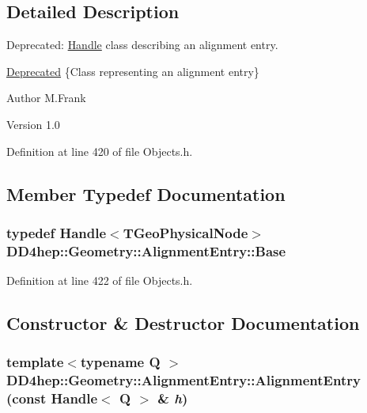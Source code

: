 \subsection{Detailed Description}
Deprecated: \hyperlink{class_d_d4hep_1_1_handle}{Handle} class describing an alignment entry. \begin{Desc}
\item[\hyperlink{deprecated__deprecated000001}{Deprecated}]\{Class representing an alignment entry\}\end{Desc}
\begin{DoxyAuthor}{Author}
M.Frank 
\end{DoxyAuthor}
\begin{DoxyVersion}{Version}
1.0 
\end{DoxyVersion}


Definition at line 420 of file Objects.h.

\subsection{Member Typedef Documentation}
\hypertarget{class_d_d4hep_1_1_geometry_1_1_alignment_entry_a5292caf0fb24d8750c2c24ef8f69a258}{
\subsubsection[{Base}]{\setlength{\rightskip}{0pt plus 5cm}typedef {\bf Handle}$<$TGeoPhysicalNode$>$ {\bf DD4hep::Geometry::AlignmentEntry::Base}}}
\label{class_d_d4hep_1_1_geometry_1_1_alignment_entry_a5292caf0fb24d8750c2c24ef8f69a258}


Definition at line 422 of file Objects.h.

\subsection{Constructor \& Destructor Documentation}
\hypertarget{class_d_d4hep_1_1_geometry_1_1_alignment_entry_adff0670c0104476e4a7fcb1d1d0ec36d}{
\subsubsection[{AlignmentEntry}]{\setlength{\rightskip}{0pt plus 5cm}template$<$typename Q $>$ DD4hep::Geometry::AlignmentEntry::AlignmentEntry (const {\bf Handle}$<$ Q $>$ \& {\em h})}}
\label{class_d_d4hep_1_1_geometry_1_1_alignment_entry_adff0670c0104476e4a7fcb1d1d0ec36d}


